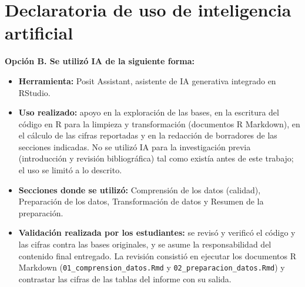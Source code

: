 \documentclass[11pt,letterpaper]{article}
\begin{document}
\section{Declaratoria de uso de inteligencia artificial}
\textbf{Opci\'on B. Se utiliz\'o IA de la siguiente forma:}
\begin{itemize}\itemsep0pt
\item \textbf{Herramienta:} Posit Assistant, asistente de IA generativa integrado en RStudio.
\item \textbf{Uso realizado:} apoyo en la exploraci\'on de las bases, en la escritura del c\'odigo en R para la limpieza y transformaci\'on (documentos R Markdown), en el c\'alculo de las cifras reportadas y en la redacci\'on de borradores de las secciones indicadas. No se utiliz\'o IA para la investigaci\'on previa (introducci\'on y revisi\'on bibliogr\'afica) tal como exist\'ia antes de este trabajo; el uso se limit\'o a lo descrito.
\item \textbf{Secciones donde se utiliz\'o:} Comprensi\'on de los datos (calidad), Preparaci\'on de los datos, Transformaci\'on de datos y Resumen de la preparaci\'on.
\item \textbf{Validaci\'on realizada por los estudiantes:} se revis\'o y verific\'o el c\'odigo y las cifras contra las bases originales, y se asume la responsabilidad del contenido final entregado. La revisi\'on consisti\'o en ejecutar los documentos R Markdown (\texttt{01\_comprension\_datos.Rmd} y \texttt{02\_preparacion\_datos.Rmd}) y contrastar las cifras de las tablas del informe con su salida.
\end{itemize}
\end{document}
